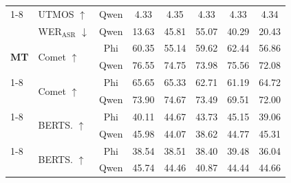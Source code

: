 \begin{table}[]
\begin{tabular}{llcccccc}
     \cmidrule(lr){1-8}
     \multirow{2}{*}{\textbf{TTS}} & UTMOS $\uparrow$ & Qwen & \cellcolor{taskblue!31} 4.33 & \cellcolor{taskblue!80} 4.35 & \cellcolor{taskblue!26} 4.33 & \cellcolor{taskblue!20} 4.33 & \cellcolor{taskblue!47} 4.34 \\
      & WER$_{\text{ASR}}$ $\downarrow$ & Qwen & \cellcolor{taskblue!80} 13.63 & \cellcolor{taskblue!33} 45.81 & \cellcolor{taskblue!20} 55.07 & \cellcolor{taskblue!41} 40.29 & \cellcolor{taskblue!70} 20.43 \\
     \midrule
     \multirow{2}{*}{\textbf{MT}} & \multirow{2}{*}{Comet $\uparrow$} & Phi & \cellcolor{taskgreen!0} 60.35 & \cellcolor{taskgreen!0} 55.14 & \cellcolor{taskgreen!0} 59.62 & \cellcolor{taskgreen!0} 62.44 & \cellcolor{taskgreen!0} 56.86 \\
      &  & Qwen & \cellcolor{taskgreen!80} 76.55 & \cellcolor{taskgreen!56} 74.75 & \cellcolor{taskgreen!46} 73.98 & \cellcolor{taskgreen!67} 75.56 & \cellcolor{taskgreen!20} 72.08 \\
     \cmidrule(lr){1-8}
     \multirow{2}{*}{\textbf{ST}} & \multirow{2}{*}{Comet $\uparrow$} & Phi & \cellcolor{taskblue!0} 65.65 & \cellcolor{taskblue!0} 65.33 & \cellcolor{taskblue!0} 62.71 & \cellcolor{taskblue!0} 61.19 & \cellcolor{taskblue!0} 64.72 \\
      &  & Qwen & \cellcolor{taskblue!71} 73.90 & \cellcolor{taskblue!80} 74.67 & \cellcolor{taskblue!66} 73.49 & \cellcolor{taskblue!20} 69.51 & \cellcolor{taskblue!49} 72.00 \\
     \cmidrule(lr){1-8}
     \multirow{2}{*}{\textbf{TSUM}} & \multirow{2}{*}{BERTS. $\uparrow$} & Phi & \cellcolor{taskgreen!32} 40.11 & \cellcolor{taskgreen!69} 44.67 & \cellcolor{taskgreen!62} 43.73 & \cellcolor{taskgreen!73} 45.15 & \cellcolor{taskgreen!24} 39.06 \\
      &  & Qwen & \cellcolor{taskgreen!80} 45.98 & \cellcolor{taskgreen!64} 44.07 & \cellcolor{taskgreen!20} 38.62 & \cellcolor{taskgreen!70} 44.77 & \cellcolor{taskgreen!75} 45.31 \\
     \cmidrule(lr){1-8}
     \multirow{2}{*}{\textbf{SSUM}} & \multirow{2}{*}{BERTS. $\uparrow$} & Phi & \cellcolor{taskblue!0} 38.54 & \cellcolor{taskblue!0} 38.51 & \cellcolor{taskblue!0} 38.40 & \cellcolor{taskblue!3} 39.48 & \cellcolor{taskblue!0} 36.04 \\
      &  & Qwen & \cellcolor{taskblue!80} 45.74 & \cellcolor{taskblue!64} 44.46 & \cellcolor{taskblue!20} 40.87 & \cellcolor{taskblue!64} 44.44 & \cellcolor{taskblue!67} 44.66 \\

\end{tabular}
\end{table}
